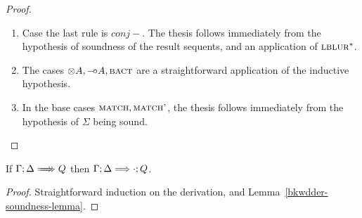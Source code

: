 \begin{proof}
\begin{enumerate}
  \item Case the last rule is $conj-$. The thesis follows immediately from
    the hypothesis of soundness of the result sequents, and an application of
    $\textsc{lblur}^*$.

  \item The cases $\otimes A, \mathbin{{-}\mkern-3.5mu{\circ}} A, \textsc{bact}$ are a straightforward application
    of the inductive hypothesis.

  \item In the base cases $\textsc{match}, \textsc{match'}$, the thesis follows
    immediately from the hypothesis of $\Sigma$ being sound.

  \end{enumerate}
\end{proof}

\begin{theorem}[Soundness]
  If $\bneuseq{\Gamma}{\Delta}{Q}$ then $\Gamma ; \Delta \Longrightarrow \cdot ; Q$.
\end{theorem}
\begin{proof}
  Straightforward induction on the derivation, and
  Lemma~\ref{bkwdder-soundness-lemma}.
\end{proof}

